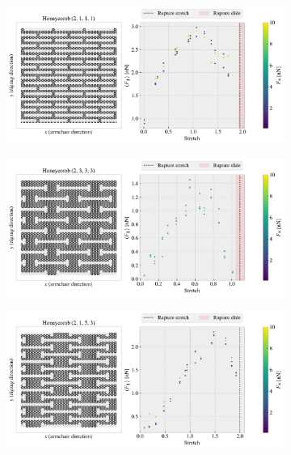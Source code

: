 \begin{figure}[H]
\begin{subfigure}[t]{0.49\textwidth}
      \caption{}
  \end{subfigure}
  \hfill
  \begin{subfigure}[t]{0.49\textwidth}
      \centering
      \includegraphics[width=\textwidth]{figures/stretch_profiles/PP_hon_12.pdf}
      \caption{}
  \end{subfigure}
  \hfill
  \begin{subfigure}[t]{0.49\textwidth}
      \centering
      \includegraphics[width=\textwidth]{figures/stretch_profiles/PP_hon_28}
      \caption{}
  \end{subfigure}
  \hfill
  \begin{subfigure}[t]{0.49\textwidth}
      \centering
      \includegraphics[width=\textwidth]{figures/stretch_profiles/PP_hon_42.pdf}

\end{subfigure}
\end{figure}
